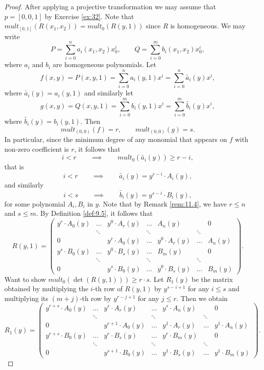 \documentclass{article}
\newcommand{\rb}[1]{\left( #1 \right)}
\renewcommand{\sb}[1]{\left[ #1 \right]}
\theoremstyle{definition}\newtheorem{definition}{Definition}[section]
\theoremstyle{definition}\newtheorem{notation}[definition]{Notation}
\theoremstyle{definition}\newtheorem{remark}[definition]{Remark}
\theoremstyle{definition}\newtheorem{example}[definition]{Example}
\theoremstyle{definition}\newtheorem{fact}{Fact}
\theoremstyle{definition}\newtheorem{exercise}{Exercise}
\begin{document}
\begin{proof}
After applying a projective transformation we may assume that $ p = \sb{0, 0, 1} $ by Exercise \ref{ex:32}. Note that $ mult_{\sb{0, 1}}\rb{R\rb{x_1, x_2}} = mult_0\rb{R\rb{y, 1}} $ since $ R $ is homogeneous. We may write
$$ P = \sum_{i = 0}^n a_i\rb{x_1, x_2}x_0^i, \qquad Q = \sum_{i = 0}^m b_i\rb{x_1, x_2}x_0^i, $$
where $ a_i $ and $ b_i $ are homogeneous polynomials. Let
$$ f\rb{x, y} = P\rb{x, y, 1} = \sum_{i = 0}^n a_i\rb{y, 1}x^i = \sum_{i = 0}^n \widetilde{a_i}\rb{y}x^i, $$
where $ \widetilde{a_i}\rb{y} = a_i\rb{y, 1} $ and similarly let
$$ g\rb{x, y} = Q\rb{x, y, 1} = \sum_{i = 0}^m b_i\rb{y, 1}x^i = \sum_{i = 0}^m \widetilde{b_i}\rb{y}x^i, $$
where $ \widetilde{b_i}\rb{y} = b_i\rb{y, 1} $. Then
$$ mult_{\rb{0, 0}}\rb{f} = r, \qquad mult_{\rb{0, 0}}\rb{g} = s. $$
In particular, since the minimum degree of any monomial that appears on $ f $ with non-zero coefficient is $ r $, it follows that
$$ i < r \qquad \implies \qquad mult_0\rb{\widetilde{a_i}\rb{y}} \ge r - i, $$
that is
$$ i < r \qquad \implies \qquad \widetilde{a_i}\rb{y} = y^{r - i} \cdot A_i\rb{y}, $$
and similarly
$$ i < s \qquad \implies \qquad \widetilde{b_i}\rb{y} = y^{s - i} \cdot B_i\rb{y}, $$
for some polynomial $ A_i, B_i $ in $ y $. Note that by Remark \ref{rem:11.4}, we have $ r \le n $ and $ s \le m $. By Definition \ref{def:9.5}, it follows that
$$ R\rb{y, 1} = \begin{pmatrix} y^r \cdot A_0\rb{y} & \dots & y^0 \cdot A_r\rb{y} & \dots & A_n\rb{y} & & 0 \\ & \ddots & & \ddots & & \ddots & \\ 0 & & y^r \cdot A_0\rb{y} & \dots & y^0 \cdot A_r\rb{y} & \dots & A_n\rb{y} \\ y^s \cdot B_0\rb{y} & \dots & y^0 \cdot B_s\rb{y} & \dots & B_m\rb{y} & & 0 \\ & \ddots & & \ddots & & \ddots & \\ 0 & & y^s \cdot B_0\rb{y} & \dots & y^0 \cdot B_s\rb{y} & \dots & B_m\rb{y} \end{pmatrix}. $$
Want to show $ mult_0\rb{\det\rb{R\rb{y, 1}}} \ge r \cdot s $. Let $ R_1\rb{y} $ be the matrix obtained by multiplying the $ i $-th row of $ R\rb{y, 1} $ by $ y^{s - i + 1} $ for any $ i \le s $ and multiplying its $ \rb{m + j} $-th row by $ y^{r - j + 1} $ for any $ j \le r $. Then we obtain
$$ R_1\rb{y} = \begin{pmatrix} y^{r + s} \cdot A_0\rb{y} & \dots & y^s \cdot A_r\rb{y} & \dots & y^s \cdot A_n\rb{y} & & 0 \\ & \ddots & & \ddots & & \ddots & \\ 0 & & y^{r + 1} \cdot A_0\rb{y} & \dots & y^1 \cdot A_r\rb{y} & \dots & y^1 \cdot A_n\rb{y} \\ y^{r + s} \cdot B_0\rb{y} & \dots & y^r \cdot B_s\rb{y} & \dots & y^r \cdot B_m\rb{y} & & 0 \\ & \ddots & & \ddots & & \ddots & \\ 0 & & y^{s + 1} \cdot B_0\rb{y} & \dots & y^1 \cdot B_s\rb{y} & \dots & y^1 \cdot B_m\rb{y} \end{pmatrix}. $$

\end{proof}
\end{document}
